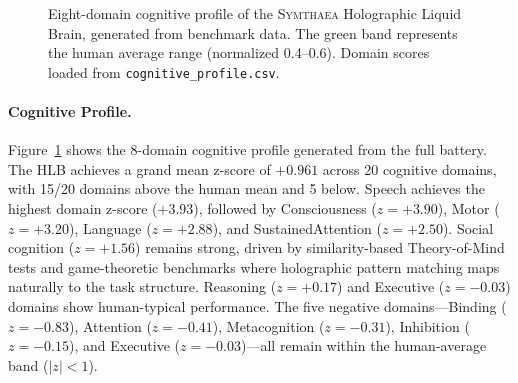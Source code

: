 \documentclass[11pt,letterpaper]{article}
\newcommand{\symthaea}{\textsc{Symthaea}}
\newcommand{\hlb}{\textsc{HLB}}
\begin{document}
\begin{figure}[t]
\caption{Eight-domain cognitive profile of the \symthaea{} Holographic Liquid Brain, generated from benchmark data. The green band represents the human average range (normalized 0.4--0.6). Domain scores loaded from \texttt{cognitive\_profile.csv}.}
\label{fig:radar}
\end{figure}

\paragraph{Cognitive Profile.} Figure~\ref{fig:radar} shows the 8-domain cognitive profile generated from the full battery. The \hlb{} achieves a grand mean z-score of $+0.961$ across 20 cognitive domains, with 15/20 domains above the human mean and 5 below. Speech achieves the highest domain z-score ($+3.93$), followed by Consciousness ($z = +3.90$), Motor ($z = +3.20$), Language ($z = +2.88$), and SustainedAttention ($z = +2.50$). Social cognition ($z = +1.56$) remains strong, driven by similarity-based Theory-of-Mind tests and game-theoretic benchmarks where holographic pattern matching maps naturally to the task structure. Reasoning ($z = +0.17$) and Executive ($z = -0.03$) domains show human-typical performance. The five negative domains---Binding ($z = -0.83$), Attention ($z = -0.41$), Metacognition ($z = -0.31$), Inhibition ($z = -0.15$), and Executive ($z = -0.03$)---all remain within the human-average band ($|z| < 1$).
\end{document}

